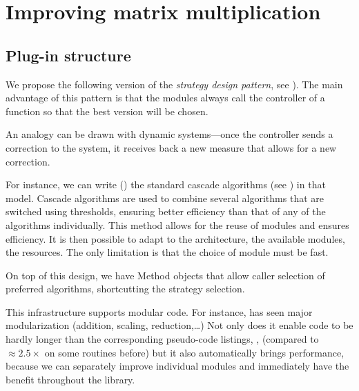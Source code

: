 \section{Improving \linbox matrix multiplication}\label{sec:matmul}
%
%
\subsection{Plug-in structure}
%
We propose the following version of the \emph{strategy design pattern}, 
see \cite[Fig 2.]{Cung:2006:TC}).
The main advantage of this pattern is that the modules always call 
the controller of a function so that the best version will be chosen. 
%

%
An analogy can be drawn with dynamic
systems---once the controller sends a correction to the system, it receives
back a new measure that allows for a new correction.
%
%
%
\par
%
For instance, we can write () the standard cascade algorithms
(see \cite{Dumas:2008:Flas}) in that model. Cascade algorithms are used to combine
several algorithms that are switched using thresholds, ensuring better
efficiency than that of any of the algorithms individually.
%
%
%
This method allows for the reuse of modules and ensures efficiency.
It is then possible to adapt to the architecture, the available modules,
the resources. The only limitation is that the choice of module
must be fast.
%

%
On top of this design, we have Method objects that allow caller selection
of preferred algorithms, shortcutting the strategy selection.
%
%
%
\par
%
This infrastructure supports modular code. For instance,
\fflasffpack has seen major  modularization (addition, scaling,
reduction,\ldots) Not only does it enable code to be hardly longer than
the corresponding pseudo-code listings, \cite{Boyer:2009:sched}, (compared to
$\approx 2.5\times$ on some routines before) but it also automatically brings
performance, because we can separately improve individual modules and immediately have the benefit throughout the library.
%
